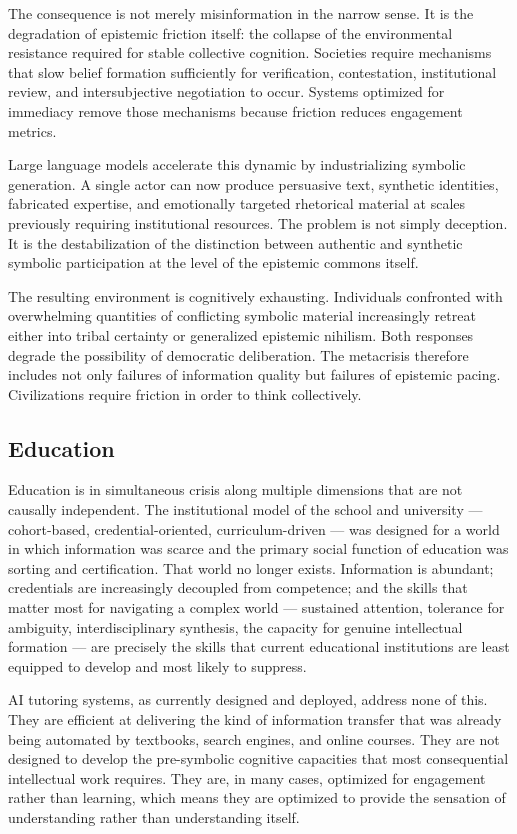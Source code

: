 \documentclass[12pt, a4paper]{article}
\theoremstyle{remark}
\begin{document}
The consequence is not merely misinformation in the narrow sense. It is the degradation of epistemic friction itself: the collapse of the environmental resistance required for stable collective cognition. Societies require mechanisms that slow belief formation sufficiently for verification, contestation, institutional review, and intersubjective negotiation to occur. Systems optimized for immediacy remove those mechanisms because friction reduces engagement metrics.

Large language models accelerate this dynamic by industrializing symbolic generation. A single actor can now produce persuasive text, synthetic identities, fabricated expertise, and emotionally targeted rhetorical material at scales previously requiring institutional resources. The problem is not simply deception. It is the destabilization of the distinction between authentic and synthetic symbolic participation at the level of the epistemic commons itself.

The resulting environment is cognitively exhausting. Individuals confronted with overwhelming quantities of conflicting symbolic material increasingly retreat either into tribal certainty or generalized epistemic nihilism. Both responses degrade the possibility of democratic deliberation. The metacrisis therefore includes not only failures of information quality but failures of epistemic pacing. Civilizations require friction in order to think collectively.

\subsection{Education}

Education is in simultaneous crisis along multiple dimensions that are not causally independent. The institutional model of the school and university --- cohort-based, credential-oriented, curriculum-driven --- was designed for a world in which information was scarce and the primary social function of education was sorting and certification. That world no longer exists. Information is abundant; credentials are increasingly decoupled from competence; and the skills that matter most for navigating a complex world --- sustained attention, tolerance for ambiguity, interdisciplinary synthesis, the capacity for genuine intellectual formation --- are precisely the skills that current educational institutions are least equipped to develop and most likely to suppress.

AI tutoring systems, as currently designed and deployed, address none of this. They are efficient at delivering the kind of information transfer that was already being automated by textbooks, search engines, and online courses. They are not designed to develop the pre-symbolic cognitive capacities that most consequential intellectual work requires. They are, in many cases, optimized for engagement rather than learning, which means they are optimized to provide the sensation of understanding rather than understanding itself.
\end{document}
